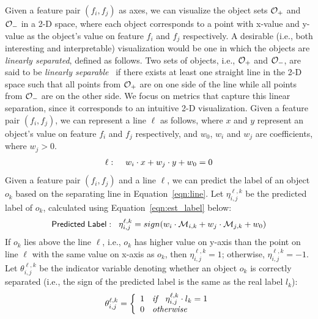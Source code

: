 Given a feature pair $(f_i,f_j)$ as axes, we can visualize the object sets ${\mathcal{O}}_+$ and ${\mathcal{O}}_-$ in a 2-D space, where each object corresponds to a point with x-value and y-value as the object's value on feature $f_i$ and $f_j$ respectively. A desirable (i.e., both interesting and interpretable) visualization would be one in which the objects are {\em linearly separated}, defined as follows. Two sets of objects, i.e., ${\mathcal{O}}_+$ and ${\mathcal{O}}_-$, are said to be \emph{linearly separable}~\cite{medin1981linear} if there exists at least one straight line in the 2-D space such that all points from ${\mathcal{O}}_+$ are on one side of the line while all points from ${\mathcal{O}}_-$ are on the other side.
We focus on metrics that capture this linear separation, since it corresponds to an intuitive 2-D visualization.
Given a feature pair $(f_i,f_j)$, we can represent a line $\ell$ as follows, where $x$ and $y$ represent an object's value on feature $f_i$ and $f_j$ respectively, and $w_0$, $w_i$ and $w_j$ are coefficients, where $w_j>0$.
\begin{equation}\label{eqn:line}
\begin{split}
\ell: \hspace{4mm} w_i\cdot x + w_j\cdot y +w_0 =0
\end{split}
\end{equation}
Given a feature pair $(f_i,f_j)$ and a line $\ell$, we can predict the label of an object $o_k$ based on the separating line in Equation~\ref{eqn:line}. Let $\eta_{i,j}^{\ell,k}$ be the predicted label of $o_k$, calculated using Equation~\ref{eqn:est_label} below:
\begin{equation}\label{eqn:est_label}
{\sf Predicted \hspace{1mm} Label:}\hspace{3mm} \eta_{i,j}^{\ell,k}=sign(w_i\cdot {\mathcal{M}}_{i,k} + w_j\cdot {\mathcal{M}}_{j,k} +w_0)
\end{equation}
\noindent If $o_k$ lies above the line $\ell$, i.e., $o_k$ has higher value on y-axis than the point on line $\ell$ with the same value on x-axis as $o_k$, then $\eta_{i,j}^{\ell,k}=1$; otherwise, $\eta_{i,j}^{\ell,k}=-1$. Let $\theta_{i,j}^{\ell,k}$ be the indicator variable denoting whether an object $o_k$ is correctly separated (i.e., the sign of the predicted label is the same as the real label $l_k$):
\begin{equation}\label{eqn:s_object}
\theta_{i,j}^{\ell,k}=\left\{
 \begin{array}{ll}
  1 \textit{\hspace{2mm} if \hspace{2mm}} \eta_{i,j}^{\ell,k}\cdot l_k = 1\\
  0 \textit{\hspace{2mm} otherwise \hspace{2mm}}
 \end{array}
 \right.
\end{equation}

